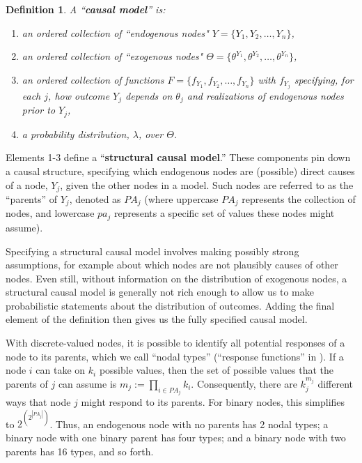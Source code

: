 \documentclass[
  11pt,
  article]{jss}
\newtheorem{definition}{Definition}
\begin{document}
\begin{definition}

  A ``\textbf{causal model}'' is:
  \begin{enumerate}
    \item an ordered collection of ``endogenous nodes" $Y = \{Y_1, Y_2, \dots, Y_n\}$,
    \item an ordered collection of ``exogenous nodes" $\Theta = \{\theta^{Y_1}, \theta^{Y_2}, \dots, \theta^{Y_n}\}$,
    \item an ordered collection of functions $F = \{f_{Y_1}, f_{Y_2}, \dots, f_{Y_n}\}$ with $f_{Y_j}$ specifying, for each $j$, how outcome $Y_j$ depends on $\theta_j$ and realizations of endogenous nodes prior to $Y_j$,
    \item a probability distribution, $\lambda$, over $\Theta$.
  \end{enumerate}

\end{definition}

Elements 1-3 define a ``\textbf{structural causal model}.'' These
components pin down a causal structure, specifying which endogenous
nodes are (possible) direct causes of a node, \(Y_j\), given the other
nodes in a model. Such nodes are referred to as the ``parents'' of
\(Y_j\), denoted as \(PA_j\) (where uppercase \(PA_j\) represents the
collection of nodes, and lowercase \(pa_j\) represents a specific set of
values these nodes might assume).

Specifying a structural causal model involves making possibly strong
assumptions, for example about which nodes are not plausibly causes of
other nodes. Even still, without information on the distribution of
exogenous nodes, a structural causal model is generally not rich enough
to allow us to make probabilistic statements about the distribution of
outcomes. Adding the final element of the definition then gives us the
fully specified causal model.

With discrete-valued nodes, it is possible to identify all potential
responses of a node to its parents, which we call ``nodal types''
(``response functions'' in \citet{pearl_causality_2009}). If a node
\(i\) can take on \(k_i\) possible values, then the set of possible
values that the parents of \(j\) can assume is
\(m_j :=\prod_{i\in PA_j}k_i\). Consequently, there are \(k_j^{m_j}\)
different ways that node \(j\) might respond to its parents. For binary
nodes, this simplifies to \(2^{\left(2^{|PA_j|}\right)}\). Thus, an
endogenous node with no parents has 2 nodal types; a binary node with
one binary parent has four types; and a binary node with two parents has
16 types, and so forth.
\end{document}
